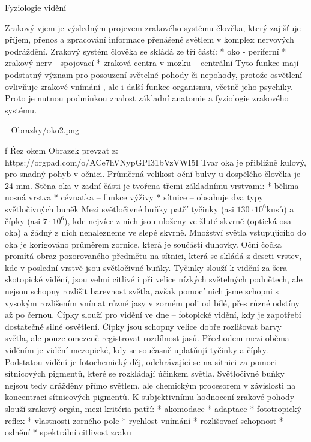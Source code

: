 \chap Fyziologie vidění

Zrakový vjem je výsledným projevem zrakového systému člověka, který zajišťuje příjem, přenos a zpracování informace přenášené světlem v komplex nervových podráždění. Zrakový systém člověka se skládá ze tří částí:
\medskip
\begitems
    * oko - periferní
    * zrakový nerv - spojovací 
    * zraková centra v mozku – centrální
\enditems
\medskip
Tyto funkce mají podstatný význam pro posouzení světelné pohody či nepohody, protože osvětlení  ovlivňuje zrakové vnímání , ale i další funkce organismu, včetně jeho psychiky. Proto je nutnou podmínkou znalost základní anatomie a fyziologie zrakového systému. 

\medskip {}
\picw=10cm _Obrazky/oko2.png
\caption/f Řez okem
\medskip
Obrazek prevzat z: https://orgpad.com/o/ACe7hVNypGPI31bVzVWI5I
\medskip
Tvar oka je přibližně kulový, pro snadný pohyb v očnici. Průměrná velikost oční bulvy u dospělého člověka je 24 mm. Stěna oka v zadní části  je tvořena třemi základnímu vrstvami:
\medskip
\begitems
    * bělima – nosná vrstva
    * cévnatka – funkce výživy
    * sítnice – obsahuje dva typy světločivných buněk
\enditems
\medskip
Mezi světločivné buňky patří tyčinky (asi $130\cdot10^6$kusů) a čípky (asi $7\cdot10^6$), kde nejvíce z nich jsou uloženy ve žluté skvrně (optická osa oka) a žádný z nich nenalezneme ve slepé skvrně.
\medskip
Množství světla vstupujícího do oka je korigováno průměrem zornice, která je součástí duhovky.
Oční čočka promítá obraz pozorovaného předmětu na sítnici, která se skládá z deseti vrstev, kde v poslední vrstvě jsou světločivné buňky. Tyčinky slouží k vidění za šera – {\sbf skotopické vidění}, jsou velmi citlivé i při velice nízkých světelných podnětech, ale nejsou schopny rozlišit barevnost světla, avšak pomocí nich jsme schopni s vysokým rozlišením vnímat různé jasy v zorném poli od bílé, přes různé odstíny až po černou. Čípky slouží pro vidění ve dne – {\sbf fotopické vidění}, kdy je zapotřebí dostatečně silné osvětlení. Čípky jsou schopny velice dobře rozlišovat barvy světla, ale pouze omezeně registrovat rozdílnost jasů. Přechodem mezi oběma viděním je vidění {\sbf mezopické}, kdy se současně uplatňují tyčinky a čípky. 
\medskip
Podstatou vidění je fotochemický děj, odehrávající se na sítnici za pomoci sítnicových pigmentů, které se rozkládají účinkem světla. Světločivné buňky nejsou tedy drážděny přímo světlem, ale chemickým procesorem v závislosti na koncentraci sítnicových pigmentů.
\medskip
K subjektivnímu hodnocení zrakové pohody slouží zrakový orgán, mezi kritéria patří:
\medskip
\begitems
    * akomodace
    * adaptace
    * fototropický reflex
    * vlastnosti zorného pole
    * rychlost vnímání
    * rozlišovací schopnost
    * oslnění
    * spektrální citlivost zraku
\enditems
\medskip

